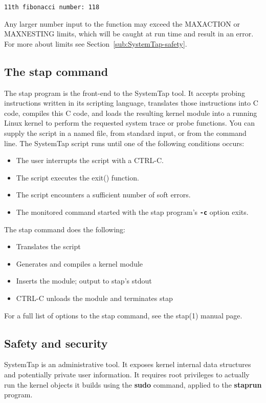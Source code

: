 \documentclass[twoside,english]{article}
\newenvironment{vindent}
{\begin{list}{}{\setlength{\listparindent}{6pt}}
\item[]}
{\end{list}}
\begin{document}
\begin{vindent}
\begin{verbatim}
11th fibonacci number: 118
\end{verbatim}
\end{vindent}
Any larger number input to the function may exceed the MAXACTION or MAXNESTING
limits, which will be caught at run time and result in an error. For more
about limits see Section~\ref{sub:SystemTap-safety}.
\newpage{}
\subsection{The stap command}
The stap program is the front-end to the SystemTap tool. It accepts probing
instructions written in its scripting language, translates those instructions
into C code, compiles this C code, and loads the resulting kernel module
into a running Linux kernel to perform the requested system trace or probe
functions. You can supply the script in a named file, from standard input,
or from the command line. The SystemTap script runs until one of the following
conditions occurs:

\begin{itemize}
\item The user interrupts the script with a CTRL-C.
\item The script executes the exit() function.
\item The script encounters a sufficient number of soft errors.
\item The monitored command started with the stap program's
\texttt{\textbf{-c}} option exits.
\end{itemize}

The stap command does the following:

\begin{itemize}
\item Translates the script
\item Generates and compiles a kernel module
\item Inserts the module; output to stap's stdout
\item CTRL-C unloads the module and terminates stap
\end{itemize}

For a full list of options to the stap command, see the stap(1) manual page.

\subsection{Safety and security\label{sub:SystemTap-safety}}
SystemTap is an administrative tool. It exposes kernel internal data structures
and potentially private user information. It requires root privileges to
actually run the kernel objects it builds using the \textbf{sudo} command,
applied to the \textbf{staprun} program.
\end{document}
